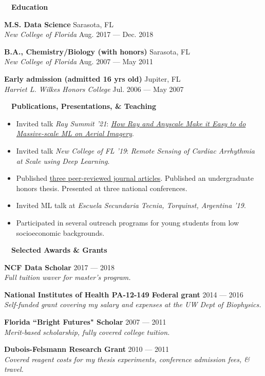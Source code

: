 \documentclass[a4paper,12pt]{article}
\newcommand{\resheading}[1]{{\hspace{-9pt} \colorbox{mygrey}{\begin{minipage}{\textwidth}{\textmd{~~\large \textbf{#1} \vphantom{p\^{E}}}}\end{minipage}}\vspace{6pt}} }
\newcommand{\ressubheading}[4]{{\begin{minipage}{\textwidth}
                                    \textbf{#1} \hfill #2 \\
                                    \textit{#3} \hfill #4 \\
\end{minipage}}}
\begin{document}
    \resheading{Education}

    \ressubheading{M.S. Data Science}{Sarasota, FL}{New College of Florida}{Aug. 2017 --- Dec. 2018}



    \ressubheading{B.A., Chemistry/Biology (with honors)}{Sarasota, FL}{New College of Florida}{Aug. 2007 --- May 2011}

    \ressubheading{Early admission (admitted 16 yrs old)}{Jupiter, FL}{Harriet L. Wilkes Honors College}{Jul. 2006 --- May 2007}

    \resheading{Publications, Presentations, \& Teaching}
    \vspace{-19pt} \begin{itemize}
                       \item Invited talk \textit{Ray Summit '21}: \href{https://raysummit.anyscale.com/content/Videos/dJRSr3NJLSP4h9CT8}{\textit{How Ray and Anyscale Make it Easy to do Massive-scale ML on Aerial Imagery}}.
                       \item Invited talk \textit{New College of FL '19}: \textit{Remote Sensing of Cardiac Arrhythmia at Scale using Deep Learning}.
                       \item Published \href{https://scholar.google.co.nz/citations?user=4ODJ78oAAAAJ&hl=en}{three peer-reviewed journal articles}.
                       Published an undergraduate honors thesis. Presented at three national conferences.
                       \item Invited ML talk at \textit{Escuela Secundaria Tecnia, Torquinst, Argentina '19}.
                       \item Participated in several outreach programs for young students from low socioeconomic backgrounds.
    \end{itemize}


    \resheading{Selected Awards \& Grants}
    \ressubheading{NCF Data Scholar}{2017 --- 2018}{Full tuition waver for master's program.}{}

    \ressubheading{National Institutes of Health PA-12-149 Federal grant}{2014 --- 2016}{Self-funded grant covering my salary and expenses at the UW Dept of Biophysics.}{}


    \ressubheading{Florida ``Bright Futures" Scholar}{2007 --- 2011}{Merit-based scholarship, fully covered college tuition.}{}

    \ressubheading{Dubois-Felsmann Research Grant}{2010 --- 2011}{Covered reagent costs for my thesis experiments, conference admission fees, \& travel.}{}
\end{document}
